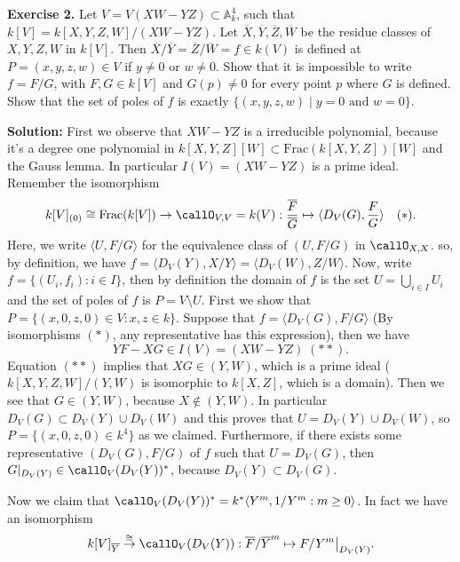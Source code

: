 \begin{dang}
   \textbf{Exercise 2.} Let \(V = V(XW - YZ) \subset \mathbb{A}^4_k\), such that \(k[V] = k[X, Y, Z, W]/(XW - YZ)\).
Let \(\overline{X}, \overline{Y}, \overline{Z}, \overline{W}\) be the residue classes of \(X, Y, Z, W\) in \(k[V]\). 
Then \(\overline{X}/\overline{Y} = \overline{Z}/\overline{W} = f \in k(V)\)
is defined at \(P = (x, y, z, w) \in V\) if \(y \neq 0\) or \(w \neq 0\). Show that it is impossible to write
\(f = F/G\), with \(F, G \in k[V]\) and \(G(p) \neq 0\) for every point \(p\) where \(G\) is defined. Show that the
set of poles of \(f\) is exactly \(\{(x, y, z, w) \mid y = 0 \text{ and } w = 0\}\).
\end{dang}
\textbf{Solution:} First we observe that $XW - YZ$ is a irreducible polynomial, because it's a degree one polynomial in 
$k[X,Y,Z][W]\subset \text{Frac}(k[X,Y,Z])[W]$ and the Gauss lemma. In particular 
$I(V)=(XW-YZ)$ is a prime ideal.
Remember the isomorphism 
\begin{equation}
    k[V]_{(0)}\cong\text{Frac}(k[V]) \rightarrow \callO_{V,V}=k(V): 
    \frac{\overline{F}}{\overline{G}}\mapsto \langle D_V(G), \frac{F}{G} \rangle\quad (*).
\end{equation}
Here, we write $\langle U, F/G\rangle$ for the equivalence class of $(U, F/G)$ in $\callO_{X,X}$.
so, by definition, we have $f=\langle D_V(Y), X/Y\rangle = \langle D_V(W), Z/W\rangle$. Now, write 
$f=\{(U_i, f_i):i\in I\}$, then by definition the domain of $f$ is the set $U=\bigcup_{i\in I}U_i$ and the set of poles 
of $f$ is $P=V\setminus U$. First we show that $P=\{(x,0,z,0)\in V :x,z\in k\}$. Suppose that 
$f=\langle D_V(G), F/G\rangle$ (By isomorphisms $(*)$, any representative has this expression), then we have
\begin{equation}
    YF - XG \in I(V)=(XW - YZ)\;(**).
\end{equation}
Equation $(**)$ implies that $XG \in (Y,W)$, which is a prime ideal ($k[X,Y,Z,W]/(Y,W)$ is isomorphic to 
$k[X,Z]$, which is a domain). Then we 
see that $G\in (Y,W)$, because $X\notin (Y,W)$. In particular $D_V(G)\subset D_V(Y)\cup D_V(W)$ and 
this proves that $U=D_V(Y)\cup D_V(W)$, so 
$P=\{(x,0,z,0)\in k^4\}$ as we claimed. Furthermore, if there exists some representative $(D_V(G), F/G)$
of $f$ such that $U=D_V(G)$, then $G|_{D_V(Y)}\in \callO_V(D_V(Y))^*$, because $D_V(Y)\subset D_V(G)$.\par 
Now we claim that $\callO_V(D_V(Y))^*=k^*\langle Y^m,1/Y^m:m\geq0\rangle$. In fact we have an isomorphism
\begin{equation}
    k[V]_{\overline{Y}}\overset{\cong}{\rightarrow} \callO_V(D_V(Y)): \overline{F}/\overline{Y}^m\mapsto 
    F/Y^m\big|_{D_V(Y)}.
\end{equation}

